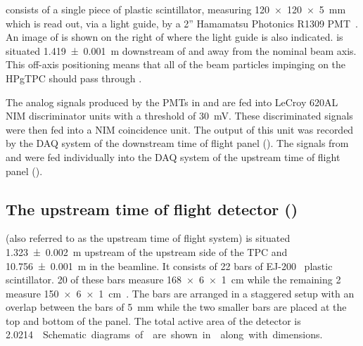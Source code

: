 \STwo consists of a single piece of plastic scintillator, measuring \SI{120 x 120 x 5}{\milli\metre} which is read out, via a light guide, by a 2'' Hamamatsu Photonics R1309 PMT~\cite{hamamatsu}.
An image of \STwo is shown on the right of  where the light guide is also indicated.
\STwo is situated \SI{1.419(1)}{\metre} downstream of \SOne and away from the nominal beam axis.
This off-axis positioning means that all of the beam particles impinging on the HPgTPC should pass through \STwo.

The analog signals produced by the PMTs in \SOne and \STwo are fed into LeCroy 620AL NIM discriminator units with a threshold of \SI{30}{\milli\volt}.
These discriminated signals were then fed into a NIM coincidence unit.
The output of this unit was recorded by the DAQ system of the downstream time of flight panel (\SFour).
The signals from \SOne and \STwo were fed individually into the DAQ system of the upstream time of flight panel (\SThree).

\subsection{The upstream time of flight detector (\SThree)}
\label{sec:hptpc_beam_flux:overview:s3}

\SThree (also referred to as the upstream time of flight system) is situated \SI{1.323(2)}{\metre} upstream of the upstream side of the TPC and \SI{10.756(1)}{\metre} in the beamline.
It consists of 22 bars of EJ-200~\cite{ej200} plastic scintillator.
20 of these bars measure \SI{168 x 6 x 1}{\centi\metre} while the remaining 2 measure \SI{150 x 6 x 1}{\centi\metre}~\cite{s3Paper}.
The bars are arranged in a staggered setup with an overlap between the bars of \SI{5}{\milli\metre} while the two smaller bars are placed at the top and bottom of the panel.
The total active area of the detector is \SI{2.0214}{\centi\metre\square}.
Schematic diagrams of \SThree are shown in  along with dimensions.

